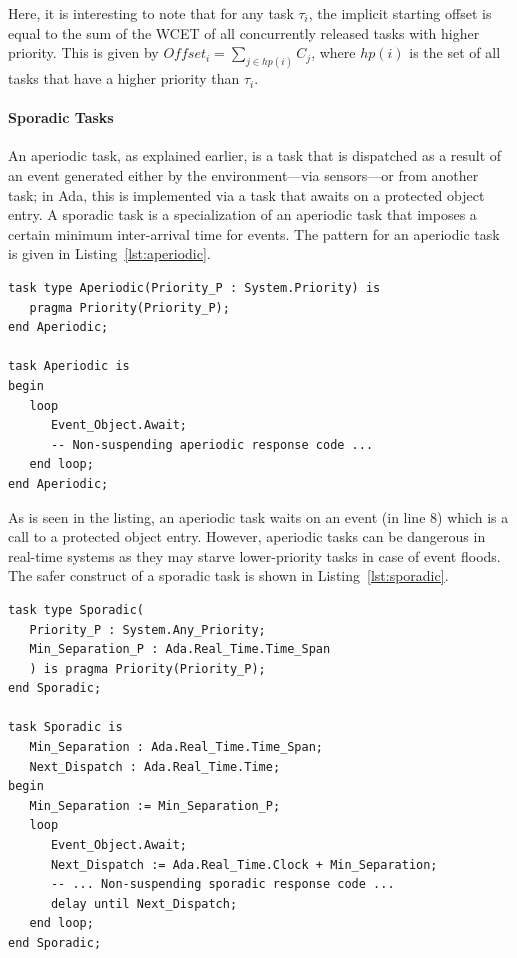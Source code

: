 Here, it is interesting to note that for any task $\tau_i$, the
implicit starting offset is equal to the sum of the WCET of all
concurrently released tasks with higher priority. This is given by
$Offset_i = \sum_{j\in hp(i)} C_j$, where $hp(i)$ is the set of all
tasks that have a higher priority than $\tau_i$.

\paragraph{Sporadic Tasks}
An aperiodic task, as explained earlier, is a task that is dispatched
as a result of an event generated either by the environment---via
sensors---or from another task; in Ada, this is implemented via a task
that awaits on a protected object entry. A sporadic task is a
specialization of an aperiodic task that imposes a certain minimum
inter-arrival time for events. The pattern for an aperiodic task is
given in Listing~\ref{lst:aperiodic}.

\begin{minipage}{\listingwidth}
\lstset{numbers=left,
numberstyle=\tiny}
\begin{lstlisting}[label=lst:aperiodic, caption=An aperiodic Ada
    Ravenscar task]
task type Aperiodic(Priority_P : System.Priority) is
   pragma Priority(Priority_P);
end Aperiodic;

task Aperiodic is
begin
   loop
      Event_Object.Await;
      -- Non-suspending aperiodic response code ...
   end loop;
end Aperiodic;
\end{lstlisting}
\end{minipage}

As is seen in the listing, an aperiodic task waits on an event (in
line 8) which is a call to a protected object entry. However,
aperiodic tasks can be dangerous in real-time systems as they may
starve lower-priority tasks in case of event floods. The safer
construct of a sporadic task is shown in Listing~\ref{lst:sporadic}.

\begin{minipage}{\listingwidth}
\lstset{language=ada,
  numbers=left,
  numberstyle=\tiny
}
\begin{lstlisting}[label=lst:sporadic, caption=A sporadic Ada Ravenscar task]
task type Sporadic(
   Priority_P : System.Any_Priority;
   Min_Separation_P : Ada.Real_Time.Time_Span
   ) is pragma Priority(Priority_P);
end Sporadic;

task Sporadic is
   Min_Separation : Ada.Real_Time.Time_Span;
   Next_Dispatch : Ada.Real_Time.Time;
begin
   Min_Separation := Min_Separation_P;
   loop
      Event_Object.Await;
      Next_Dispatch := Ada.Real_Time.Clock + Min_Separation;
      -- ... Non-suspending sporadic response code ...
      delay until Next_Dispatch;
   end loop;
end Sporadic;
\end{lstlisting}
\end{minipage}

